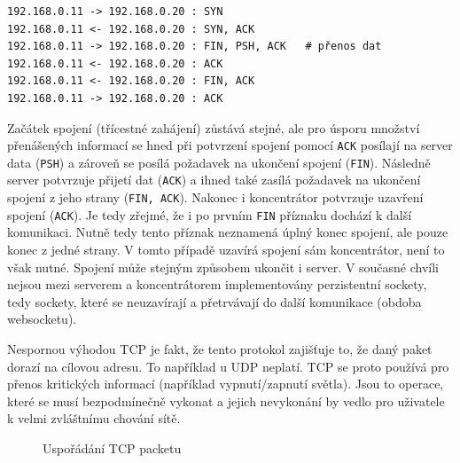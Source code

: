 \begin{verbatim}
192.168.0.11 -> 192.168.0.20 : SYN
192.168.0.11 <- 192.168.0.20 : SYN, ACK
192.168.0.11 -> 192.168.0.20 : FIN, PSH, ACK   # přenos dat
192.168.0.11 <- 192.168.0.20 : ACK
192.168.0.11 <- 192.168.0.20 : FIN, ACK
192.168.0.11 -> 192.168.0.20 : ACK
\end{verbatim}

Začátek spojení (třícestné zahájení) zůstává stejné, ale pro úsporu množství přenášených informací se hned při potvrzení spojení pomocí \texttt{ACK} posílají na server data (\texttt{PSH}) a zároveň se posílá požadavek na ukončení spojení (\texttt{FIN}). Následně server potvrzuje přijetí dat (\texttt{ACK}) a ihned také zasílá požadavek na ukončení spojení z jeho strany (\texttt{FIN, ACK}). Nakonec i koncentrátor potvrzuje uzavření spojení (\texttt{ACK}). Je tedy zřejmé, že i po prvním \texttt{FIN} příznaku dochází k další komunikaci. Nutně tedy tento příznak neznamená úplný konec spojení, ale pouze konec z jedné strany. V tomto případě uzavírá spojení sám koncentrátor, není to však nutné. Spojení může stejným způsobem ukončit i server. V současné chvíli nejsou mezi serverem a koncentrátorem implementovány perzistentní sockety, tedy sockety, které se neuzavírají a přetrvávají do další komunikace (obdoba websocketu).

Nespornou výhodou TCP je fakt, že tento protokol zajišťuje to, že daný paket dorazí na cílovou adresu. To například u UDP neplatí. TCP se proto používá pro přenos kritických informací (například vypnutí/zapnutí světla). Jsou to operace, které se musí bezpodmínečně vykonat a jejich nevykonání by vedlo pro uživatele k velmi zvláštnímu chování sítě.

\begin{figure}[H]
    \centering
	\caption{Uspořádání TCP packetu}
	\label{fig:tcp-packet}
\end{figure}


